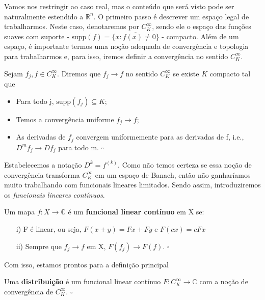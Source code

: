 \documentclass[measure_theory.tex]{subfiles}
\begin{document}
Vamos nos restringir ao caso real, mas o conteúdo que será visto pode ser naturalmente estendido a \(\mathbb{R}^{n}.\) O primeiro passo é descrever um espaço legal de trabalharmos. Neste caso,
denotaremos por \(C_{K}^{\infty}\), sendo ele o espaço das funções suaves com suporte - \(\mathrm{supp}(f) = \overline{\{x: f(x)\neq0\}}\) - compacto. Além de um espaço, é importante termos uma noção adequada de convergência e topologia
para trabalharmos e, para isso, iremos definir a convergência no sentido \(C_{K}^{\infty}.\)
\begin{def*}
	Sejam \(f_{j}, f\in C_{K}^{\infty}\). Diremos que \(f_{j}\to f\) no sentido \(C_{K}^{\infty}\) se existe \(K\) compacto tal que
	\begin{itemize}
		\item Para todo j, \(\mathrm{supp}(f_{j})\subseteq K\);
		\item Temos a convergência uniforme \(f_{j}\to f\);
		\item As derivadas de \(f_{j}\) convergem uniformemente para as derivadas de f, i.e., \(D^{m}f_{j}\to Df_{j}\) para todo m. \(\square\)
	\end{itemize}
\end{def*}
Estabelecemos a notação \(D^{k} = f^{(k)}\).
Como não temos certeza se essa noção de convergência transforma \(C_{K}^{\infty}\) em um espaço de Banach, então não ganharíamos muito trabalhando com funcionais lineares limitados. Sendo assim, introduziremos
os \textit{funcionais lineares contínuos}.
\begin{def*}
	Um mapa \(f:X\rightarrow \mathbb{C}\) é um \textbf{funcional linear contínuo} em X se:
	\begin{itemize}
		\item[i)] F é linear, ou seja, \(F(x+y) = Fx + Fy\) e \(F(cx) = cFx\)
		\item[ii)] Sempre que \(f_{j}\to f\) em X, \(F(f_{j})\to F(f)\). \(\square\)
	\end{itemize}
\end{def*}
Com isso, estamos prontos para a definição principal
\begin{def*}
	Uma \textbf{distribuição} é um funcional linear contínuo \(F:C_{K}^{\infty}\rightarrow \mathbb{C}\) com a noção de convergência de \(C_{K}^{\infty}.\) \(\square\)
\end{def*}
\end{document}
